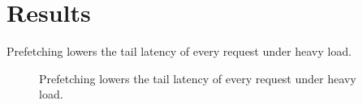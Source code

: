 \section{Results}
Prefetching lowers the tail latency of every request under heavy load.
\begin{figure}
\caption{Prefetching lowers the tail latency of every request under heavy load.}
\end{figure}
